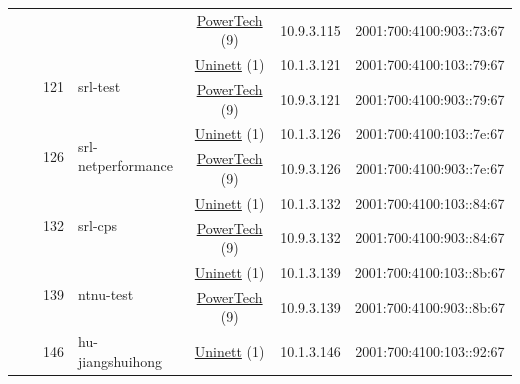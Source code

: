 \begin{small}
\begin{center}
\begin{longtable}{|c|c|c|c|c|c|c|c|}
  &  &  &  & \multicolumn{2}{|c|}{\tiny{\href{http://www.powertech.no}{PowerTech} (9)}} & \tiny{10.9.3.115} & \tiny{2001:700:4100:903::73:67} \\* \cline{3-3}\cline{4-4}\cline{5-5}\cline{6-6}\cline{7-7}\cline{8-8}
  &  & \multirow{2}{*}{\tiny{121}} & \multicolumn{1}{|l|}{\multirow{2}{*}{\tiny{srl-test}}} & \multicolumn{2}{|c|}{\tiny{\href{https://www.uninett.no}{Uninett} (1)}} & \tiny{10.1.3.121} & \tiny{2001:700:4100:103::79:67} \\* \cline{5-5}\cline{6-6}\cline{7-7}\cline{8-8}
  &  &  &  & \multicolumn{2}{|c|}{\tiny{\href{http://www.powertech.no}{PowerTech} (9)}} & \tiny{10.9.3.121} & \tiny{2001:700:4100:903::79:67} \\* \cline{3-3}\cline{4-4}\cline{5-5}\cline{6-6}\cline{7-7}\cline{8-8}
  &  & \multirow{2}{*}{\tiny{126}} & \multicolumn{1}{|l|}{\multirow{2}{*}{\tiny{srl-netperformance}}} & \multicolumn{2}{|c|}{\tiny{\href{https://www.uninett.no}{Uninett} (1)}} & \tiny{10.1.3.126} & \tiny{2001:700:4100:103::7e:67} \\* \cline{5-5}\cline{6-6}\cline{7-7}\cline{8-8}
  &  &  &  & \multicolumn{2}{|c|}{\tiny{\href{http://www.powertech.no}{PowerTech} (9)}} & \tiny{10.9.3.126} & \tiny{2001:700:4100:903::7e:67} \\* \cline{3-3}\cline{4-4}\cline{5-5}\cline{6-6}\cline{7-7}\cline{8-8}
  &  & \multirow{2}{*}{\tiny{132}} & \multicolumn{1}{|l|}{\multirow{2}{*}{\tiny{srl-cps}}} & \multicolumn{2}{|c|}{\tiny{\href{https://www.uninett.no}{Uninett} (1)}} & \tiny{10.1.3.132} & \tiny{2001:700:4100:103::84:67} \\* \cline{5-5}\cline{6-6}\cline{7-7}\cline{8-8}
  &  &  &  & \multicolumn{2}{|c|}{\tiny{\href{http://www.powertech.no}{PowerTech} (9)}} & \tiny{10.9.3.132} & \tiny{2001:700:4100:903::84:67} \\* \cline{3-3}\cline{4-4}\cline{5-5}\cline{6-6}\cline{7-7}\cline{8-8}
  &  & \multirow{2}{*}{\tiny{139}} & \multicolumn{1}{|l|}{\multirow{2}{*}{\tiny{ntnu-test}}} & \multicolumn{2}{|c|}{\tiny{\href{https://www.uninett.no}{Uninett} (1)}} & \tiny{10.1.3.139} & \tiny{2001:700:4100:103::8b:67} \\* \cline{5-5}\cline{6-6}\cline{7-7}\cline{8-8}
  &  &  &  & \multicolumn{2}{|c|}{\tiny{\href{http://www.powertech.no}{PowerTech} (9)}} & \tiny{10.9.3.139} & \tiny{2001:700:4100:903::8b:67} \\* \cline{3-3}\cline{4-4}\cline{5-5}\cline{6-6}\cline{7-7}\cline{8-8}
  &  & \multirow{2}{*}{\tiny{146}} & \multicolumn{1}{|l|}{\multirow{2}{*}{\tiny{hu-jiangshuihong}}} & \multicolumn{2}{|c|}{\tiny{\href{https://www.uninett.no}{Uninett} (1)}} & \tiny{10.1.3.146} & \tiny{2001:700:4100:103::92:67} \\* \cline{5-5}\cline{6-6}\cline{7-7}\cline{8-8}

\end{longtable}
\end{center}
\end{small}
